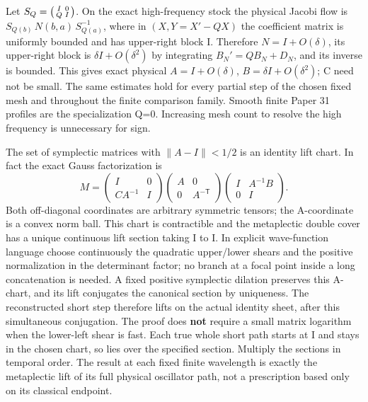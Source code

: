\documentclass[11pt]{article}
\begin{document}
Let \(S_Q=\begin{psmallmatrix}I&0\\Q&I\end{psmallmatrix}\). On the exact high-frequency stock the physical Jacobi flow is \(S_{Q(b)}\,N(b,a)\,S_{Q(a)}^{-1}\), where in \((X,Y=X'-QX)\) the coefficient matrix is uniformly bounded and has upper-right block I. Therefore \(N=I+O(\delta)\), its upper-right block is \(\delta I+O(\delta^2)\) by integrating \(B_N'=Q B_N+D_N\), and its inverse is bounded. This gives exact physical \(A=I+O(\delta)\), \(B=\delta I+O(\delta^2)\); C need not be small. The same estimates hold for every partial step of the chosen fixed mesh and throughout the finite comparison family. Smooth finite Paper 31 profiles are the specialization Q=0. Increasing mesh count to resolve the high frequency is unnecessary for sign.

The set of symplectic matrices with \(\|A-I\|<1/2\) is an identity lift chart. In fact the exact Gauss factorization is
\[
 M=\begin{pmatrix}I&0\\ CA^{-1}&I\end{pmatrix}
   \begin{pmatrix}A&0\\0&A^{-\mathsf T}\end{pmatrix}
   \begin{pmatrix}I&A^{-1}B\\0&I\end{pmatrix}.
\]
Both off-diagonal coordinates are arbitrary symmetric tensors; the A-coordinate is a convex norm ball. This chart is contractible and the metaplectic double cover has a unique continuous lift section taking I to I. In explicit wave-function language choose continuously the quadratic upper/lower shears and the positive normalization in the determinant factor; no branch at a focal point inside a long concatenation is needed. A fixed positive symplectic dilation preserves this A-chart, and its lift conjugates the canonical section by uniqueness. The reconstructed short step therefore lifts on the actual identity sheet, after this simultaneous conjugation. The proof does \textbf{not} require a small matrix logarithm when the lower-left shear is fast. Each true whole short path starts at I and stays in the chosen chart, so lies over the specified section. Multiply the sections in temporal order. The result at each fixed finite wavelength is exactly the metaplectic lift of its full physical oscillator path, not a prescription based only on its classical endpoint.
\end{document}
